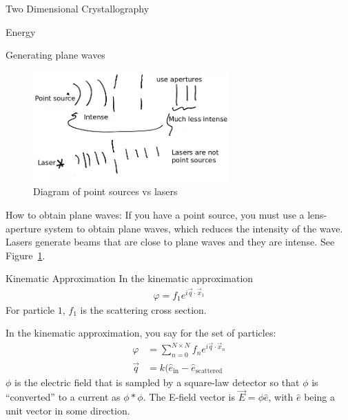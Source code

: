\documentclass{article}
\begin{document}
\begin{section}{Two Dimensional Crystallography}
\begin{subsection}{Energy}
\end{subsection}
\begin{subsection}
	{Generating plane waves}
	\begin{figure}[h]
		\centering
		\includegraphics[height=120pt]{lasers}
		\caption{Diagram of point sources vs lasers}
		\label{fig:lasers}
	\end{figure}
	How to obtain plane waves: If you have a point source, you must use a lens-aperture system to obtain plane waves, which reduces the intensity of the wave. Lasers generate beams that are close to plane waves and they are intense. See Figure~\ref{fig:lasers}.
\end{subsection}
\begin{subsection}{Kinematic Approximation}
In the kinematic approximation
\begin{align*}
	\varphi = f_1 e^{i\vec{q}\cdot\vec{x}_1} 
\end{align*}
For particle $1$, $f_1$ is the scattering cross section.

In the kinematic approximation, you say for the set of particles:
\begin{align*}
	\varphi &= \sum_{n=0}^{N\times N} f_n e^{i \vec{q}\cdot\vec{x}_n}\\
	\vec{q} &= k(\hat{e}_\text{in} - \hat{e}_\text{scattered}
\end{align*}
$\phi$ is the electric field that is sampled by a square-law detector so that $\phi$ is ``converted'' to a current as $\phi\ast\phi$.
The E-field vector is $\vec{E} = \phi\hat{e}$, with $\hat{e}$ being a unit vector in some direction.


\end{subsection}
\end{section}
\end{document}
